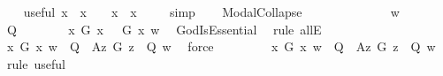 \begin{isabellebody}
\ \ \isamarkupfalse%
\ useful{\isacharcolon}\ {\isachardoublequoteopen}{\isacharparenleft}{\isasymforall}x{\isachardot}\ {\isasymphi}\ x\ {\isasymlongrightarrow}\ {\isasympsi}{\isacharparenright}\ {\isasymLongrightarrow}\ {\isacharparenleft}{\isacharparenleft}{\isasymexists}x{\isachardot}\ {\isasymphi}\ x{\isacharparenright}\ {\isasymlongrightarrow}\ {\isasympsi}{\isacharparenright}{\isachardoublequoteclose}%
\ %
%
\isamarkupfalse%
\ simp%
%
%
\isanewline
\ \ \isamarkupfalse%
\ ModalCollapse{\isacharcolon}\ {\isachardoublequoteopen}{\isasymlfloor}\isactrlbold {\isasymforall}{\isasymPhi}{\isachardot}\ {\isasymPhi}\ \isactrlbold {\isasymrightarrow}\ \isactrlbold {\isasymbox}{\isasymPhi}{\isasymrfloor}{\isachardoublequoteclose}%
\ %
%
\isamarkupfalse%
\ {\isacharminus}\isanewline
\ \ \ \isacommand{{\isacharbraceleft}}\isamarkupfalse%
\ \isamarkupfalse%
\ w\isanewline
\ \ \ \ \ \isacommand{{\isacharbraceleft}}\isamarkupfalse%
\ \isamarkupfalse%
\ Q\isanewline
\ \ \ \ \ \ \isamarkupfalse%
\ {\isachardoublequoteopen}{\isacharparenleft}\isactrlbold {\isasymforall}x{\isachardot}\ G\ x\ \isactrlbold {\isasymrightarrow}\ {\isacharparenleft}{\isasymE}\ G\ x{\isacharparenright}{\isacharparenright}\ w{\isachardoublequoteclose}\ \isamarkupfalse%
\ GodIsEssential\ \isamarkupfalse%
\ {\isacharparenleft}rule\ allE{\isacharparenright}\isanewline
\ \ \ \ \ \ \isamarkupfalse%
\ {\isachardoublequoteopen}{\isasymforall}x{\isachardot}\ G\ x\ w\ {\isasymlongrightarrow}\ {\isacharparenleft}Q\ \isactrlbold {\isasymrightarrow}\ \isactrlbold {\isasymbox}{\isacharparenleft}\isactrlbold {\isasymforall}\isactrlsup Az{\isachardot}\ G\ z\ \isactrlbold {\isasymrightarrow}\ Q{\isacharparenright}{\isacharparenright}\ w{\isachardoublequoteclose}\ \isamarkupfalse%
\ force\isanewline
\ \ \ \ \ \ \isamarkupfalse%
\ {}{\isacharcolon}\ {\isachardoublequoteopen}{\isacharparenleft}{\isasymexists}x{\isachardot}\ G\ x\ w{\isacharparenright}\ {\isasymlongrightarrow}\ {\isacharparenleft}{\isacharparenleft}Q\ \isactrlbold {\isasymrightarrow}\ \isactrlbold {\isasymbox}{\isacharparenleft}\isactrlbold {\isasymforall}\isactrlsup Az{\isachardot}\ G\ z\ \isactrlbold {\isasymrightarrow}\ Q{\isacharparenright}{\isacharparenright}\ w{\isacharparenright}{\isachardoublequoteclose}\ \isamarkupfalse%
\ {\isacharparenleft}rule\ useful{\isacharparenright}\isanewline
\ \ \ \ \ \ \isamarkupfalse%

\end{isabellebody}

